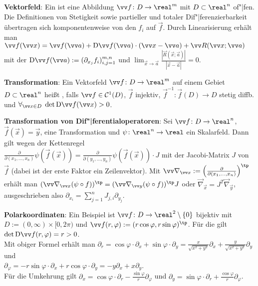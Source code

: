\textbf{Vektorfeld}:
Ein  ist eine Abbildung $\vec{f}\colon D \to \real^m$ mit
$D \subset \real^n$ of"|fen.
Die Definitionen von Stetigkeit sowie partieller und totaler Dif"|ferenzierbarkeit
übertragen sich komponentenweise von den $f_i$ auf $\vec{f}$.
Durch Linearisierung erhält man
$\vec{f}(\vec{x}) = \vec{f}(\vec{a}) + \D\vec{f}(\vec{a}) \cdot (\vec{x} - \vec{a}) +
\vec{R}(\vec{x}; \vec{a})$
mit der  $\D\vec{f}(\vec{a}) := (\partial_{x_j} f_i)_{i,j=1}^{m,n}$
und $\lim_{\vec{x} \to \vec{a}} \frac{|\vec{R}(\vec{x}; \vec{a})|}{|\vec{x} - \vec{a}|} = 0$.

\linie

\textbf{Transformation}:
Ein Vektorfeld $\vec{f}\colon D \to \real^m$ auf einem Gebiet $D \subset \real^n$ heißt
, falls
$\vec{f} \in \C^1(D)$,
$\vec{f}$ injektiv,
$\vec{f}^{-1}\colon \vec{f}(D) \to D$ stetig diffb. und
$\forall_{\vec{x} \in D}\; \det \D\vec{f}(\vec{x}) > 0$.

\textbf{Transformation von Dif"|ferentialoperatoren}:
Sei $\vec{f}\colon D \to \real^n$, $\vec{f}(\vec{x}) = \vec{y}$, eine Transformation und
$\psi\colon \real^n \to \real$ ein Skalarfeld.
Dann gilt wegen der Kettenregel\\
$\frac{\partial}{\partial(x_1, \dotsc, x_n)} \psi(\vec{f}(\vec{x}))
= \frac{\partial}{\partial(y_1, \dotsc, y_n)} \psi(\vec{f}(\vec{x})) \cdot J$
mit der Jacobi-Matrix $J$ von $\vec{f}$
(dabei ist der erste Faktor ein Zeilenvektor).
Mit $\vec{\nabla}_{\vec{x}} := \left(\frac{\partial}{\partial(x_1, \dotsc, x_n)}\right)^\tp$
erhält man
$(\vec{\nabla}_{\vec{x}} (\psi \circ f))^\tp = (\vec{\nabla}_{\vec{y}} (\psi \circ f))^\tp J$
oder $\vec{\nabla}_{\vec{x}} = J^T \vec{\nabla}_{\vec{y}}$, ausgeschrieben also
$\partial_{x_i} = \sum_{j=1}^n J_{j,i} \partial_{y_j}$.

\linie

\textbf{Polarkoordinaten}:
Ein Beispiel ist $\vec{f}\colon D \to \real^2 \setminus \{0\}$ bijektiv mit
$D := (0, \infty) \times [0, 2\pi)$ und
$\vec{f}(r, \varphi) := (r\cos\varphi, r\sin\varphi)^\tp$.
Für die  gilt
$\det \D\vec{f}(r, \varphi) = r > 0$.\\
Mit obiger Formel erhält man
$\partial_r = \cos\varphi \cdot \partial_x + \sin\varphi \cdot \partial_y
= \frac{x}{\sqrt{x^2 + y^2}} \partial_x + \frac{y}{\sqrt{x^2 + y^2}} \partial_y$ und\\
$\partial_\varphi = -r \sin\varphi \cdot \partial_x + r \cos\varphi \cdot \partial_y
= -y \partial_x + x \partial_y$.\\
Für die Umkehrung gilt
$\partial_x = \cos\varphi \cdot \partial_r - \frac{\sin\varphi}{r} \partial_\varphi$ und
$\partial_y = \sin\varphi \cdot \partial_r + \frac{\cos\varphi}{r} \partial_\varphi$.

